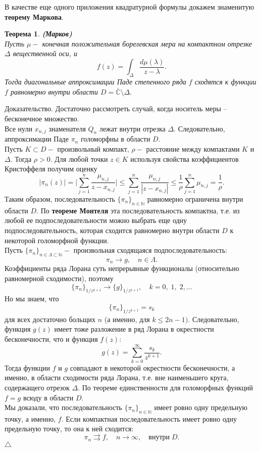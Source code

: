 \documentclass[12 pt, a4 paper]{article}
\theoremstyle{plain}   \newtheorem{Pro}{Задача}
\newtheorem{The}{Теорема}
\begin{document}
В качестве еще одного приложения квадратурной формулы
докажем знаменитую
{\bfseries теорему Маркова}.
\begin{The}
{\bfseries (Марков)}
\\
Пусть
$ \mu - $
конечная положительная борелевская мера на компактном отрезке
$ \Delta $
вещественной оси, и
$$
  f(z)=\int _{\Delta}
  \frac{d \mu (\lambda )}{z-\lambda}.
$$
Тогда диагональные аппроксимации Паде степенного ряда
$ f $
сходятся к функции
$ f $
равномерно внутри области
$ D= \bar{\mathbb{C}} \setminus \Delta . $
\end{The}
{\Large Доказательство.}
Достаточно рассмотреть случай, когда носитель меры --
бесконечное множество.\\
Все нули
$ x_{n,j} $
знаменателя
$ Q_n $
лежат внутри отрезка
$ \Delta . $
Следовательно, аппроксимации Паде
$ \pi _n $
голоморфны в области
$ D . $
\\
Пусть
$ K \subset D - $
произвольный компакт,
$ \rho - $
расстояние между компактами
$ K $
и
$ \Delta . $
Тогда
$ \rho >0 . $
Для любой точки
$ z \in K $
используя свойства коэффициентов Кристоффеля получим оценку
$$
  | \pi _n (z) |=
  \biggl | \sum _{j=1}^n
  \frac{\mu _{n,j}}{z-x_{n,j}} \biggr | \leq
  \sum _{j=1}^n \frac{\mu _{n,j}}{|z-x_{n,j}|} \leq
  \frac{1}{\rho} \sum _{j=1}^n \mu _{n,j} =\frac{1}{\rho}.
$$
Таким образом, последовательность
$ \{ \pi _n \} _{n \in \mathbb{N}} $
равномерно ограничена внутри области
$ D . $
По
{\bfseries теореме Монтеля}
эта последовательность компактна, т.е.
из любой ее подпоследовательности можно выбрать еще
одну подпоследовательность, которая сходится равномерно
внутри области
$ D $
к некоторой голоморфной функции.\\
Пусть
$ \{ \pi _n \} _{ n \in \Lambda \subset \mathbb{N}} - $
произвольная сходящаяся подпоследовательность:
$$
  \pi _n \rightarrow g , \quad n \in \Lambda .
$$
Коэффициенты ряда Лорана суть непрерывные функционалы
(относительно равномерной сходимости), поэтому
$$
  \{ \pi _n \} _{1/z^{k+1}}
  \rightarrow
  \{ g \} _{1/z^{k+1}},
  \quad k=0, \; 1, \; 2,...
$$
Но мы знаем, что
$$
  \{ \pi _n \} _{1/z^{k+1}} =s_k
$$
для всех достаточно больщих
$ n $
(а именно, для
$ k \leq 2n-1 ) . $
Следовательно, функция
$ g(z) $
имеет тоже разложение в ряд Лорана в окрестности бесконечности, что и
функция
$ f(z) : $
$$
  g(z)= \sum _{k=0}^{\infty}
  \frac{s_k}{z^{k+1}} .
$$
Тогда функции
$ f $
и
$ g $
совпадают в некоторой окрестности бесконечности, а именно,
в области сходимости ряда Лорана, т.е. вне наименьшего
круга, содержащего отрезок
$ \Delta . $
По теореме единственности для голоморфных функций
$ f=g $
всюду в области
$ D . $
\\
Мы доказали, что последовательность
$ \{ \pi _n \} _{n \in \mathbb{N}} $
имеет ровно одну предельную точку, а именно,
$ f . $
Если компактная последовательность имеет ровно одну
предельную точку, то она к ней сходится:
$$
  \pi _n \rightrightarrows f , \quad
  n \rightarrow \infty , \quad
  внутри \; D .
$$
$ \triangle $
\\
\end{document}
